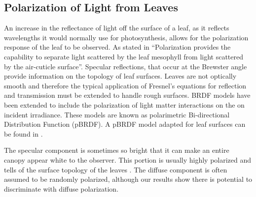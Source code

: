 \subsection{Polarization of Light from Leaves}

An increase in the reflectance of light off the surface of a leaf, as it reflects wavelengths it would normally use for photosynthesis, allows for the polarization response of the leaf to be observed.  As stated in \cite{photonvegetation} “Polarization provides the capability to separate light scattered by the leaf mesophyll from light scattered by the air-cuticle surface”.  Specular reflections, that occur at the Brewster angle provide information on the topology of leaf surfaces.  Leaves are not optically smooth and therefore the typical application of Fresnel’s equations for reflection and transmission must be extended to handle rough surfaces. BRDF models have been extended to include the polarization of light matter interactions on the on incident irradiance.  These models are known as polarimetric Bi-directional Distribution Function (pBRDF).  A pBRDF model adapted for leaf surfaces can be found in \cite{photonvegetation}.

The specular component is sometimes so bright that it can make an entire canopy appear white to the observer.  This portion is usually highly polarized and tells of the surface topology of the leaves \cite{vanderbilt}.  The diffuse component is often assumed to be randomly polarized, although our results show there is potential to discriminate with diffuse polarization.
